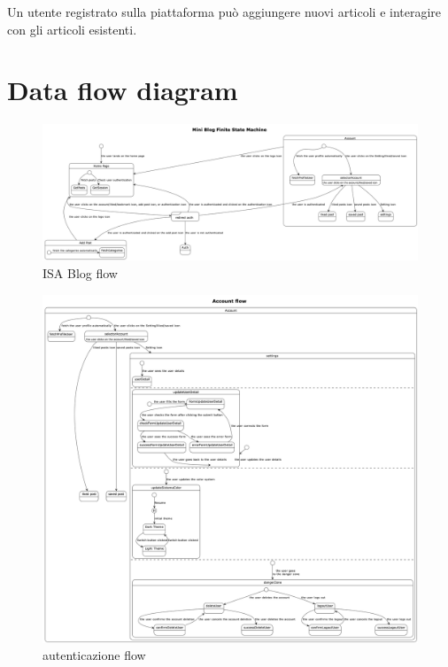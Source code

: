 \documentclass{article}
\begin{document}
    Un utente registrato sulla piattaforma può aggiungere nuovi articoli e interagire con gli articoli esistenti.

    \clearpage
    \section{Data flow diagram}
    \label{sec:data_flow_diagram}


    \begin{figure}[h]
        \centering
        \includegraphics[width=1.3\textwidth]{ingblog_flow}
        \caption{ISA Blog flow}
        \label{fig:figure5}
    \end{figure}

    \begin{figure}[h]
        \centering
        \includegraphics[width=1.3\textwidth]{account_page_flow}
        \caption{autenticazione flow}
        \label{fig:figure6}
    \end{figure}
\end{document}
